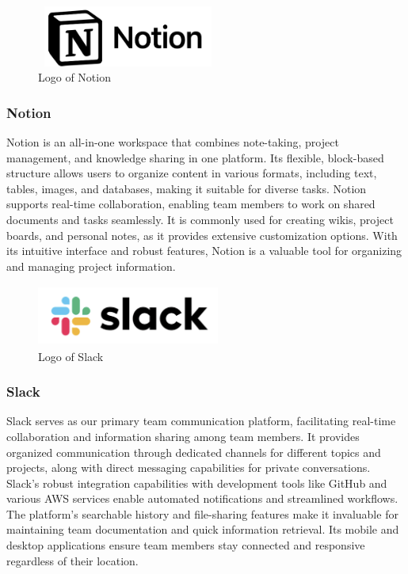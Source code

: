 \documentclass[conference]{IEEEtran}
\begin{document}
        \begin{figure}[htbp]
            \centerline{\includegraphics[width=6cm, height=2cm]{Images/logo/notion.png}}
            \caption{Logo of Notion}
            \label{fig}
        \end{figure}
        \subsubsection{Notion}
            Notion is an all-in-one workspace that combines note-taking, project management, and knowledge sharing in one platform. Its flexible, block-based structure allows users to organize content in various formats, including text, tables, images, and databases, making it suitable for diverse tasks. Notion supports real-time collaboration, enabling team members to work on shared documents and tasks seamlessly. It is commonly used for creating wikis, project boards, and personal notes, as it provides extensive customization options. With its intuitive interface and robust features, Notion is a valuable tool for organizing and managing project information.

        \begin{figure}[htbp]
            \centerline{\includegraphics[width=6cm, height=2cm]{Images/logo/slack.png}}
            \caption{Logo of Slack}
            \label{fig}
        \end{figure}
        \subsubsection{Slack}
            Slack serves as our primary team communication platform, facilitating real-time collaboration and information sharing among team members. It provides organized communication through dedicated channels for different topics and projects, along with direct messaging capabilities for private conversations. Slack's robust integration capabilities with development tools like GitHub and various AWS services enable automated notifications and streamlined workflows. The platform's searchable history and file-sharing features make it invaluable for maintaining team documentation and quick information retrieval. Its mobile and desktop applications ensure team members stay connected and responsive regardless of their location.
\end{document}
